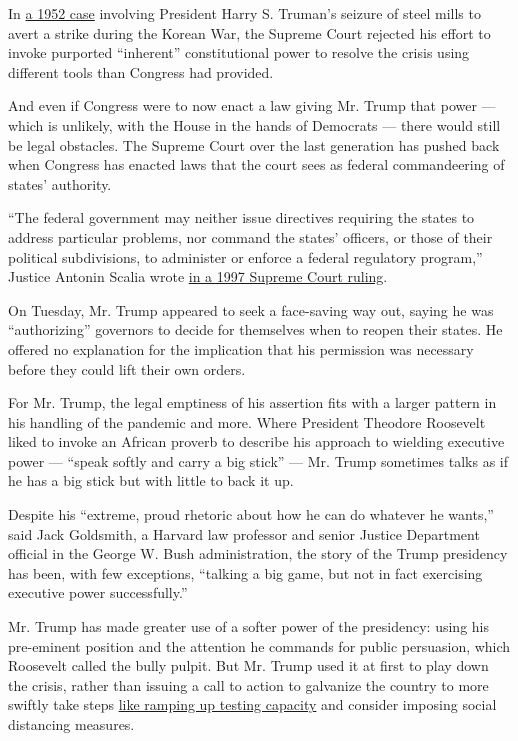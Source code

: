 In \href{https://supreme.justia.com/cases/federal/us/343/579/}{a 1952
case} involving President Harry S. Truman's seizure of steel mills to
avert a strike during the Korean War, the Supreme Court rejected his
effort to invoke purported ``inherent'' constitutional power to resolve
the crisis using different tools than Congress had provided.

And even if Congress were to now enact a law giving Mr. Trump that power
--- which is unlikely, with the House in the hands of Democrats ---
there would still be legal obstacles. The Supreme Court over the last
generation has pushed back when Congress has enacted laws that the court
sees as federal commandeering of states' authority.

``The federal government may neither issue directives requiring the
states to address particular problems, nor command the states' officers,
or those of their political subdivisions, to administer or enforce a
federal regulatory program,'' Justice Antonin Scalia wrote
\href{https://casetext.com/case/printz-v-us}{in a 1997 Supreme Court
ruling}.

On Tuesday, Mr. Trump appeared to seek a face-saving way out, saying he
was ``authorizing'' governors to decide for themselves when to reopen
their states. He offered no explanation for the implication that his
permission was necessary before they could lift their own orders.

For Mr. Trump, the legal emptiness of his assertion fits with a larger
pattern in his handling of the pandemic and more. Where President
Theodore Roosevelt liked to invoke an African proverb to describe his
approach to wielding executive power --- ``speak softly and carry a big
stick'' --- Mr. Trump sometimes talks as if he has a big stick but with
little to back it up.

Despite his ``extreme, proud rhetoric about how he can do whatever he
wants,'' said Jack Goldsmith, a Harvard law professor and senior Justice
Department official in the George W. Bush administration, the story of
the Trump presidency has been, with few exceptions, ``talking a big
game, but not in fact exercising executive power successfully.''

Mr. Trump has made greater use of a softer power of the presidency:
using his pre-eminent position and the attention he commands for public
persuasion, which Roosevelt called the bully pulpit. But Mr. Trump used
it at first to play down the crisis, rather than issuing a call to
action to galvanize the country to more swiftly take steps
\href{https://www.nytimes3xbfgragh.onion/2020/03/28/us/testing-coronavirus-pandemic.html}{like
ramping up testing capacity} and consider imposing social distancing
measures.

